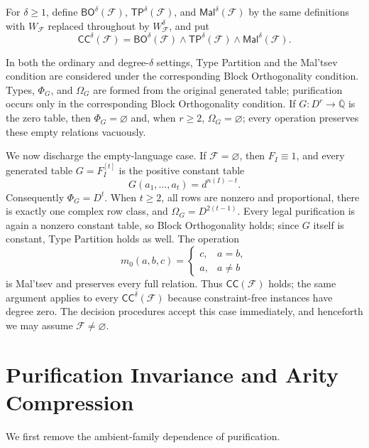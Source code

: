 \documentclass[11pt]{article}
\theoremstyle{plain}
\theoremstyle{definition}
\theoremstyle{remark}
\newcommand{\AlgNums}{\overline{\mathbb Q}}
\newcommand{\cF}{\mathcal F}
\newcommand{\CC}{\mathsf{CC}}
\newcommand{\BO}{\mathsf{BO}}
\newcommand{\TP}{\mathsf{TP}}
\newcommand{\Mal}{\mathsf{Mal}}
\newcommand{\WFdeg}[1]{W_{\cF}^{#1}}
\newcommand{\SuppRel}[1]{\Phi_{#1}}
\newcommand{\RowEq}[1]{\Omega_{#1}}
\begin{document}
For $\delta\ge1$, define $\BO^\delta(\cF)$,
$\TP^\delta(\cF)$, and $\Mal^\delta(\cF)$ by the same definitions with
$W_{\cF}$ replaced throughout by $\WFdeg{\delta}$, and put
\[
  \CC^\delta(\cF)
  =\BO^\delta(\cF)\wedge\TP^\delta(\cF)\wedge\Mal^\delta(\cF).
\]

In both the ordinary and degree-$\delta$ settings, Type Partition and the
Mal'tsev condition are considered under the corresponding Block Orthogonality
condition.  Types, $\SuppRel G$, and $\RowEq G$ are formed from the original
generated table; purification occurs only in the corresponding Block
Orthogonality condition.  If $G:D^r\to\AlgNums$ is the zero table, then
$\SuppRel G=\varnothing$ and, when $r\ge2$,
$\RowEq G=\varnothing$; every operation preserves these empty relations
vacuously.

We now discharge the empty-language case.  If $\cF=\varnothing$, then
$F_I\equiv1$, and every generated table $G=F_I^{[t]}$ is the positive
constant table
\[
  G(a_1,\ldots,a_t)=d^{n(I)-t}.
\]
Consequently $\SuppRel G=D^t$.  When $t\ge2$, all rows are nonzero and
proportional, there is exactly one complex row class, and
$\RowEq G=D^{2(t-1)}$.  Every legal purification is again a nonzero constant
table, so Block Orthogonality holds; since $G$ itself is constant, Type
Partition holds as well.  The operation
\[
  m_0(a,b,c)=
  \begin{cases}
    c,&a=b,\\
    a,&a\ne b
  \end{cases}
\]
is Mal'tsev and preserves every full relation.  Thus $\CC(\cF)$ holds; the
same argument applies to every $\CC^\delta(\cF)$ because constraint-free
instances have degree zero.  The decision procedures accept this case
immediately, and henceforth we may assume $\cF\ne\varnothing$.

\section{Purification Invariance and Arity Compression}
\label{sec:purification-compression}

We first remove the ambient-family dependence of purification.
\end{document}
